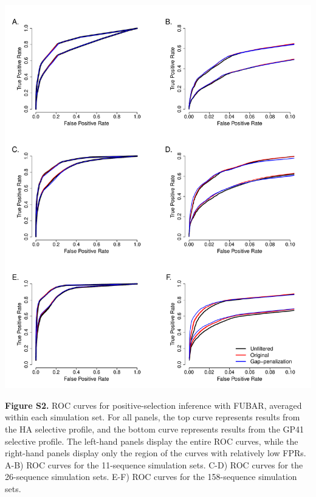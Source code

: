 \documentclass[11pt]{article}
\begin{document}
\newpage
\centerline{\includegraphics[width=6.5in]{Figures/ROC_SI_fubar.pdf}}
\noindent \textbf{Figure S2.} ROC curves for positive-selection inference with FUBAR, averaged within each simulation set. For all panels, the top curve represents results from the HA selective profile, and the bottom curve represents results from the GP41 selective profile. The left-hand panels display the entire ROC curves, while the right-hand panels display only the region of the curves with relatively low FPRs.  A-B) ROC curves for the 11-sequence simulation sets. C-D) ROC curves for the 26-sequence simulation sets. E-F) ROC curves for the 158-sequence simulation sets.

\newpage


	
\end{document}
